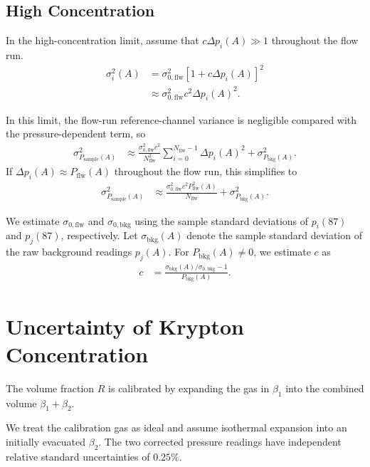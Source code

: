 \documentclass{article}
\begin{document}
\subsection{High Concentration}

\begin{keyidea}
    In the high-concentration limit, assume that $c\Delta p_i(A) \gg 1$ throughout the flow run.
    \begin{align}
        \sigma_i^2(A) &= \sigma^2_{0,\mathrm{flw}}\left[1 + c\Delta p_i(A)\right]^2 \\
        &\approx \sigma^2_{0,\mathrm{flw}} c^2\Delta p_i(A)^2.
    \end{align}
\end{keyidea}

In this limit, the flow-run reference-channel variance is negligible compared with the pressure-dependent term, so
\begin{align}
    \sigma^2_{P_\mathrm{sample}(A)} &\approx \frac{\sigma^2_{0,\mathrm{flw}}c^2}{N_\mathrm{flw}^2}
        \sum_{i=0}^{N_\mathrm{flw}-1}\Delta p_i(A)^2 + \sigma^2_{P_\mathrm{bkg}(A)}.
\end{align}
If $\Delta p_i(A)\approx P_\mathrm{flw}(A)$ throughout the flow run, this simplifies to
\begin{align}
    \sigma^2_{P_\mathrm{sample}(A)} &\approx \frac{\sigma^2_{0,\mathrm{flw}}c^2P^2_\mathrm{flw}(A)}{N_\mathrm{flw}}
        + \sigma^2_{P_\mathrm{bkg}(A)}.
\end{align}

We estimate $\sigma_{0,\mathrm{flw}}$ and $\sigma_{0,\mathrm{bkg}}$
using the sample standard deviations of $p_i(87)$ and $p_j(87)$,
respectively. Let $\sigma_\mathrm{bkg}(A)$ denote the sample standard
deviation of the raw background readings $p_j(A)$. For
$P_\mathrm{bkg}(A) \ne 0$, we estimate $c$ as
\begin{align}
    c &= \frac{\sigma_\mathrm{bkg}(A)/\sigma_{0,\mathrm{bkg}} - 1}{P_\mathrm{bkg}(A)}.
\end{align}

\section{Uncertainty of Krypton Concentration}

The volume fraction $R$ is calibrated by expanding the gas in $\beta_1$ into the combined volume $\beta_1+\beta_2$.

\begin{keyidea}
    We treat the calibration gas as ideal and assume isothermal expansion into an initially evacuated $\beta_2$. The two corrected pressure readings have independent relative standard uncertainties of $0.25\%$.
\end{keyidea}
\end{document}

